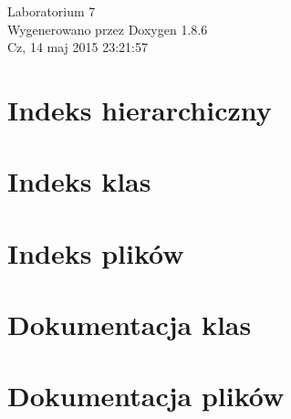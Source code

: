 \documentclass[twoside]{article}
\begin{document}
\hypersetup{pageanchor=false}
\begin{titlepage}
\vspace*{7cm}
\begin{center}%
{\Large Laboratorium 7 }\\
\vspace*{1cm}
{\large Wygenerowano przez Doxygen 1.8.6}\\
\vspace*{0.5cm}
{\small Cz, 14 maj 2015 23:21:57}\\
\end{center}
\end{titlepage}
\tableofcontents
{}
\hypersetup{pageanchor=true}

\section{Indeks hierarchiczny}

\section{Indeks klas}

\section{Indeks plików}

\section{Dokumentacja klas}

















\section{Dokumentacja plików}







































\newpage
{}
{}
\printindex
\end{document}
